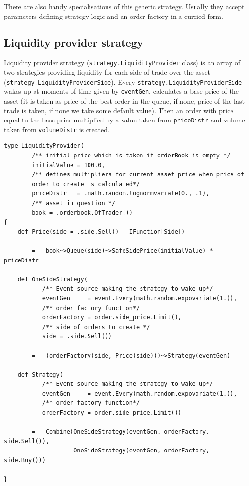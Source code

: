 \documentclass[a4paper,11pt]{article}
\begin{document}
There are also handy specialisations of this generic strategy. Usually
they accept parameters defining strategy logic and an order factory in a
curried form.

\subsection{Liquidity provider
strategy}\label{liquidity-provider-strategy}

Liquidity provider strategy (\texttt{strategy.LiquidityProvider} class)
is an array of two strategies providing liquidity for each side of trade
over the asset (\texttt{strategy.LiquidityProviderSide}). Every
\texttt{strategy.LiquidityProviderSide} wakes up at moments of time
given by \texttt{eventGen}, calculates a base price of the asset (it is
taken as price of the best order in the queue, if none, price of the
last trade is taken, if none we take some default value). Then an order
with price equal to the base price multiplied by a value taken from
\texttt{priceDistr} and volume taken from \texttt{volumeDistr} is
created.

\begin{verbatim}
type LiquidityProvider(
        /** initial price which is taken if orderBook is empty */
        initialValue = 100.0,
        /** defines multipliers for current asset price when price of
        order to create is calculated*/
        priceDistr   = .math.random.lognormvariate(0., .1),
        /** asset in question */
        book = .orderbook.OfTrader())
{
    def Price(side = .side.Sell() : IFunction[Side])

        =   book~>Queue(side)~>SafeSidePrice(initialValue) * priceDistr

    def OneSideStrategy(
           /** Event source making the strategy to wake up*/
           eventGen     = event.Every(math.random.expovariate(1.)),
           /** order factory function*/
           orderFactory = order.side_price.Limit(),
           /** side of orders to create */
           side = .side.Sell())

        =   (orderFactory(side, Price(side)))~>Strategy(eventGen)

    def Strategy(
           /** Event source making the strategy to wake up*/
           eventGen     = event.Every(math.random.expovariate(1.)),
           /** order factory function*/
           orderFactory = order.side_price.Limit())

        =   Combine(OneSideStrategy(eventGen, orderFactory, side.Sell()),
                    OneSideStrategy(eventGen, orderFactory, side.Buy()))

}
\end{verbatim}
\end{document}
